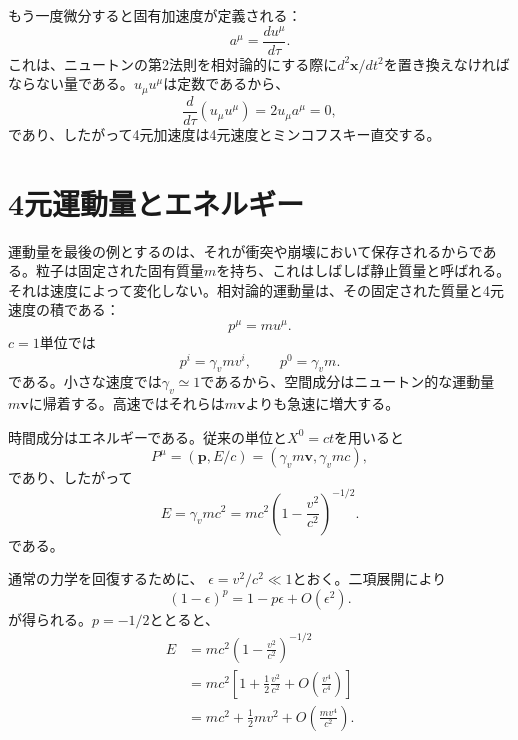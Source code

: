 もう一度微分すると固有加速度が定義される：
\begin{equation}
a^\mu=\frac{du^\mu}{d\tau}.
\end{equation}
これは、ニュートンの第2法則を相対論的にする際に\(d^2\mathbf x/dt^2\)を置き換えなければならない量である。\(u_\mu u^\mu\)は定数であるから、
\begin{equation}
\frac{d}{d\tau}(u_\mu u^\mu)=2u_\mu a^\mu=0,
\end{equation}
であり、したがって4元加速度は4元速度とミンコフスキー直交する。

\section{4元運動量とエネルギー}

運動量を最後の例とするのは、それが衝突や崩壊において保存されるからである。粒子は固定された固有質量\(m\)を持ち、これはしばしば静止質量と呼ばれる。それは速度によって変化しない。相対論的運動量は、その固定された質量と4元速度の積である：
\begin{equation}
p^\mu=mu^\mu.
\label{eq:l5-four-momentum}
\end{equation}
\(c=1\)単位では
\begin{equation}
p^i=\gamma_v m v^i,
\qquad
p^0=\gamma_v m.
\end{equation}
である。小さな速度では\(\gamma_v\simeq1\)であるから、空間成分はニュートン的な運動量\(m\mathbf v\)に帰着する。高速ではそれらは\(m\mathbf v\)よりも急速に増大する。

時間成分はエネルギーである。従来の単位と\(X^0=ct\)を用いると
\begin{equation}
P^\mu=(\mathbf p,E/c)
=(\gamma_v m\mathbf v,\gamma_v mc),
\end{equation}
であり、したがって
\begin{equation}
E=\gamma_v mc^2
=mc^2\left(1-\frac{v^2}{c^2}\right)^{-1/2}.
\label{eq:l5-relativistic-energy}
\end{equation}
である。

通常の力学を回復するために、
\(\epsilon=v^2/c^2\ll1\)とおく。二項展開により
\begin{equation}
(1-\epsilon)^p=1-p\epsilon+O(\epsilon^2).
\end{equation}
が得られる。\(p=-1/2\)ととると、
\begin{align}
E
&=mc^2\left(1-\frac{v^2}{c^2}\right)^{-1/2}\nonumber\\
&=mc^2\left[1+\frac12\frac{v^2}{c^2}
  +O\!\left(\frac{v^4}{c^4}\right)\right]\nonumber\\
&=mc^2+\frac12mv^2+O\!\left(\frac{mv^4}{c^2}\right).
\label{eq:l5-energy-expansion}
\end{align}

